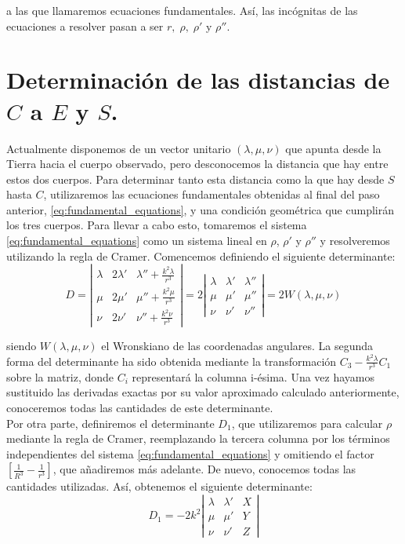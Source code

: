 \documentclass[11pt]{book}
\begin{document}
\noindent a las que llamaremos ecuaciones fundamentales. Así, las incógnitas de las ecuaciones a resolver pasan a ser $r, \; \rho, \; \rho'$ y $\rho''$.\\



\section{Determinación de las distancias de $C$ a $E$ y $S$.}
\label{sec:distancias}
Actualmente disponemos de un vector unitario $(\lambda,\mu,\nu)$ que apunta desde la Tierra hacia el cuerpo observado, pero desconocemos la distancia que hay entre estos dos cuerpos. Para determinar tanto esta distancia como la que hay desde $S$ hasta $C$, utilizaremos las ecuaciones fundamentales obtenidas al final del paso anterior, \eqref{eq:fundamental_equations}, y una condición geométrica que cumplirán los tres cuerpos. Para llevar a cabo esto, tomaremos el sistema \eqref{eq:fundamental_equations} como un sistema lineal en $\rho$, $\rho'$ y $\rho''$ y resolveremos utilizando la regla de Cramer. Comencemos definiendo el siguiente determinante:
\[
D =
\left|
\begin{array}{ccc}
	\lambda & 2\lambda' & \lambda''+\frac{k^2\lambda}{r^3}\\
	\mu & 2\mu' & \mu''+\frac{k^2\mu}{r^3}\\
	\nu & 2\nu' & \nu''+\frac{k^2\nu}{r^3}
\end{array}
\right|
=
2
\left|
\begin{array}{ccc}
	\lambda & \lambda' & \lambda''\\
	\mu & \mu' & \mu''\\
	\nu & \nu' & \nu''
\end{array}
\right|
=2W(\lambda,\mu,\nu)
\]

\noindent siendo $W(\lambda,\mu,\nu)$ el Wronskiano de las coordenadas angulares. La segunda forma del determinante ha sido obtenida mediante la transformación $C_3-\frac{k^2\lambda}{r^3}C_1$ sobre la matriz, donde $C_i$ representará la columna i-ésima. Una vez hayamos sustituido las derivadas exactas por su valor aproximado calculado anteriormente, conoceremos todas las cantidades de este determinante.\\

Por otra parte, definiremos el determinante $D_1$, que utilizaremos para calcular $\rho$ mediante la regla de Cramer, reemplazando la tercera columna por los términos independientes del sistema \eqref{eq:fundamental_equations} y omitiendo el factor $[\frac{1}{R^3}-\frac{1}{r^3}]$, que añadiremos más adelante. De nuevo, conocemos todas las cantidades utilizadas. Así, obtenemos el siguiente determinante:
\[
D_1 = -2k^2
\left|
\begin{array}{ccc}
\lambda & \lambda' & X\\
\mu & \mu' & Y\\
\nu & \nu' & Z
\end{array}
\right|
\]
\end{document}
